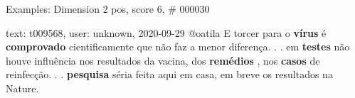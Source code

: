 \begin{frame}{Examples: Dimension 2 pos, score 6, \# 000030}
\footnotesize
\begin{exampleblock}{text: t009568, user: unknown, 2020-09-29}
@oatila E torcer para o \textbf{vírus} é \textbf{comprovado} cientificamente 
que não faz a menor diferença. . . em \textbf{testes} não houve influência nos 
resultados da vacina, dos \textbf{remédios} , nos \textbf{casos} de reinfecção. 
. . \textbf{pesquisa} séria feita aqui em casa, em breve os resultados na 
Nature.  
\end{exampleblock}
\end{frame}
